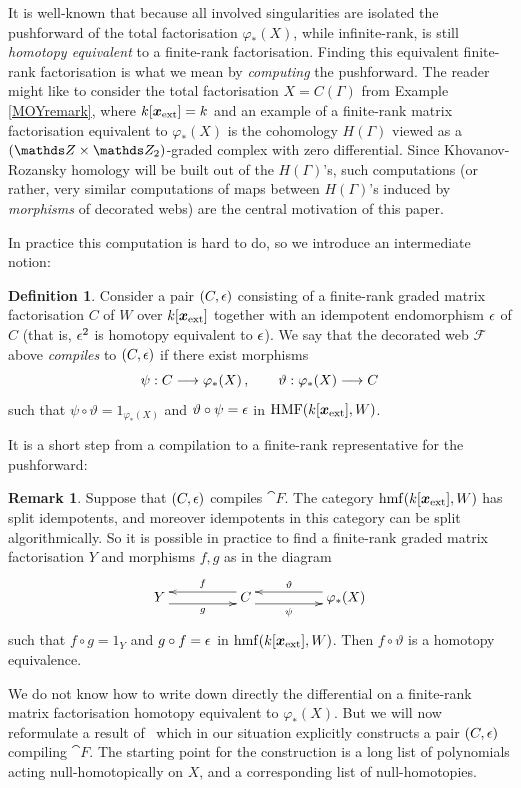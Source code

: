 \documentclass{compositio}
\theoremstyle{definition}
\newtheorem{definition}[theorem]{Definition}
\newtheorem{remark}[theorem]{Remark}
\numberwithin{equation}{section}
\DeclareMathOperator{\hmf}{hmf}
\begin{document}
It is well-known that because all involved singularities are isolated the pushforward of the total factorisation $\varphi_*(X)$, while infinite-rank, is still \emph{homotopy equivalent} to a finite-rank factorisation. Finding this equivalent finite-rank factorisation is what we mean by \emph{computing} the pushforward. The reader might like to consider the total factorisation $X = C(\Gamma)$ from Example \ref{MOYremark}, where $k[\boldsymbol{x}_{\textup{ext}}] = k$ and an example of a finite-rank matrix factorisation equivalent to $\varphi_*(X)$ is the cohomology $H(\Gamma)$ viewed as a $(\ZZ \times \Ztwo)$-graded complex with zero differential. Since Khovanov-Rozansky homology will be built out of the $H(\Gamma)$'s, such computations (or rather, very similar computations of maps between $H(\Gamma)$'s induced by \emph{morphisms} of decorated webs) are the central motivation of this paper.

In practice this computation is hard to do, so we introduce an intermediate notion:

\begin{definition} Consider a pair $(C, \epsilon)$ consisting of a finite-rank graded matrix factorisation $C$ of $W$ over $k[\boldsymbol{x}_{\textup{ext}}]$ together with an idempotent endomorphism $\epsilon$ of $C$ (that is, $\epsilon^2$ is homotopy equivalent to $\epsilon$). We say that the decorated web $\mathcal F$ above \emph{compiles} to $(C,\epsilon)$ if there exist morphisms
\[
\psi: C \longrightarrow \varphi_*(X) \, , \qquad \vartheta: \varphi_*(X) \longrightarrow C
\]
such that $\psi \circ \vartheta = 1_{\varphi_*(X)}$ and $\vartheta \circ \psi = \epsilon$ in $\operatorname{HMF}(k[\boldsymbol{x}_{\textup{ext}}],W)$.
\end{definition}

It is a short step from a compilation to a finite-rank representative for the pushforward:

\begin{remark} Suppose that $(C, \epsilon)$ compiles $\cat{F}$. The category $\hmf(k[\extvar],W)$ has split idempotents, and moreover idempotents in this category can be split algorithmically. So it is possible in practice to find a finite-rank graded matrix factorisation $Y$ and morphisms $f,g$ as in the diagram
\[
\xymatrix@C+2pc{
Y \ar@<-1ex>[r]_-{g} & C \ar@<-1ex>[l]_-{f}\ar@<-1ex>[r]_-{\psi} & \varphi_*(X) \ar@<-1ex>[l]_-{\vartheta}
}
\]
such that $f \circ g = 1_Y$ and $g \circ f = \epsilon$ in $\hmf(k[\extvar], W)$. Then $f \circ \vartheta$ is a homotopy equivalence. 
\end{remark}

We do not know how to write down directly the differential on a finite-rank matrix factorisation homotopy equivalent to $\varphi_*(X)$. But we will now reformulate a result of~\cite{dm1102.2957} which in our situation explicitly constructs a pair $(C, \epsilon)$ compiling $\cat{F}$. The starting point for the construction is a long list of polynomials acting null-homotopically on $X$, and a corresponding list of null-homotopies.
\end{document}
